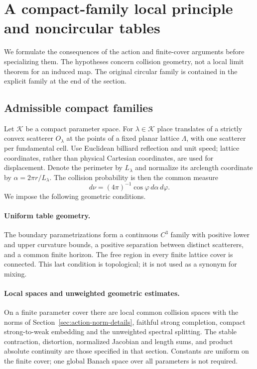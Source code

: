 \section{A compact-family local principle and noncircular tables}
\label{sec:compact-family-local-principle}
We formulate the consequences of the action and finite-cover arguments
before specializing them. The hypotheses concern collision geometry,
not a local limit theorem for an induced map. The original circular
family is contained in the explicit family at the end of the section.

\subsection{Admissible compact families}
Let $\mathcal K$ be a compact parameter space. For $\lambda\in\mathcal K$
place translates of a strictly convex scatterer $O_\lambda$ at the
points of a fixed planar lattice $\Lambda$, with one scatterer per
fundamental cell. Use Euclidean billiard reflection and unit speed;
lattice coordinates, rather than physical Cartesian coordinates, are
used for displacement. Denote the perimeter by $L_\lambda$ and
normalize its arclength coordinate by $\alpha=2\pi r/L_\lambda$.
The collision probability is then the common measure
\[
 d\nu=(4\pi)^{-1}\cos\varphi\,d\alpha\,d\varphi.
\]
We impose the following geometric conditions.

\paragraph{Uniform table geometry.}
The boundary parametrizations form a continuous $C^3$ family with
positive lower and upper curvature bounds, a positive separation
between distinct scatterers, and a common finite horizon. The free
region in every finite lattice cover is connected. This last condition
is topological; it is not used as a synonym for mixing.

\paragraph{Local spaces and unweighted geometric estimates.}
On a finite parameter cover there are local common collision spaces
with the norms of Section~\ref{sec:action-norm-details}, faithful strong
completion, compact strong-to-weak embedding and the unweighted
spectral splitting. The stable contraction, distortion, normalized
Jacobian and length sums, and product absolute continuity are those
specified in that section. Constants are uniform on the finite cover;
one global Banach space over all parameters is not required.


